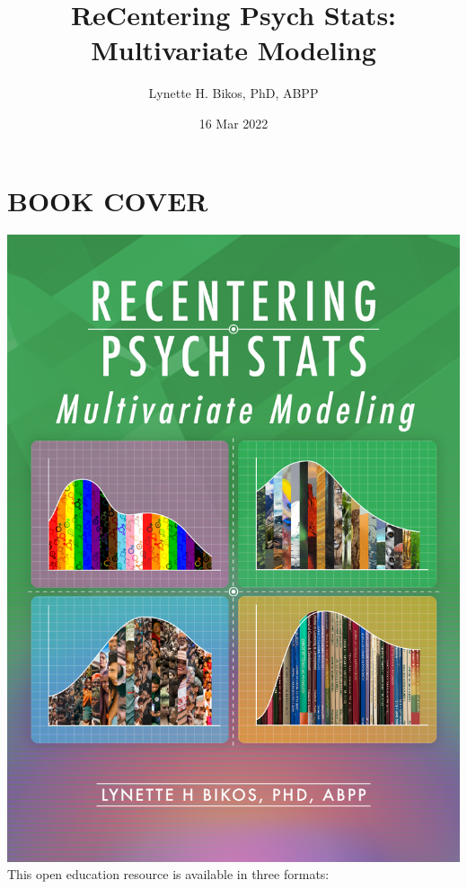 \documentclass[
  11pt,
]{book}
\title{ReCentering Psych Stats: Multivariate Modeling}
\author{Lynette H. Bikos, PhD, ABPP}
\date{16 Mar 2022}
\begin{document}
\maketitle

{
\hypersetup{linkcolor=}
\setcounter{tocdepth}{1}
\tableofcontents
}
\hypertarget{book-cover}{%
\chapter*{BOOK COVER}\label{book-cover}}

\includegraphics{images/ReC_multivariate_bkcvr.png}
This open education resource is available in three formats:
\end{document}

